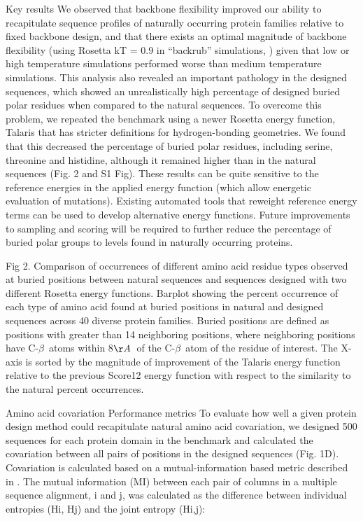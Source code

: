 Key results
We observed that backbone flexibility improved our ability to recapitulate sequence profiles of naturally occurring protein families relative to fixed backbone design, and that there exists an optimal magnitude of backbone flexibility (using Rosetta kT = 0.9 in “backrub” simulations, \cite{ollikainen_computational_2013}) given that low or high temperature simulations performed worse than medium temperature simulations. This analysis also revealed an important pathology in the designed sequences, which showed an unrealistically high percentage of designed buried polar residues when compared to the natural sequences. To overcome this problem, we repeated the benchmark using a newer Rosetta energy function, Talaris \cite{omeara_combined_2015} that has stricter definitions for hydrogen-bonding geometries. We found that this decreased the percentage of buried polar residues, including serine, threonine and histidine, although it remained higher than in the natural sequences (Fig. 2 and S1 Fig). These results can be quite sensitive to the reference energies in the applied energy function (which allow energetic evaluation of mutations). Existing automated tools \cite{leaver-fay_chapter_2013} that reweight reference energy terms can be used to develop alternative energy functions. Future improvements to sampling and scoring will be required to further reduce the percentage of buried polar groups to levels found in naturally occurring proteins.

Fig 2. Comparison of occurrences of different amino acid residue types observed at buried positions between natural sequences and sequences designed with two different Rosetta energy functions.
Barplot showing the percent occurrence of each type of amino acid found at buried positions in natural and designed sequences across 40 diverse protein families. Buried positions are defined as positions with greater than 14 neighboring positions, where neighboring positions have C-$\beta$\ atoms within 8$\AA$\ of the C-$\beta$\ atom of the residue of interest. The X-axis is sorted by the magnitude of improvement of the Talaris energy function relative to the previous Score12 energy function with respect to the similarity to the natural percent occurrences.

Amino acid covariation
Performance metrics
To evaluate how well a given protein design method could recapitulate natural amino acid covariation, we designed 500 sequences for each protein domain in the benchmark and calculated the covariation between all pairs of positions in the designed sequences (Fig. 1D). Covariation is calculated based on a mutual-information based metric described in \cite{dickson_identifying_2010}. The mutual information (MI) between each pair of columns in a multiple sequence alignment, i and j, was calculated as the difference between individual entropies (Hi, Hj) and the joint entropy (Hi,j):



